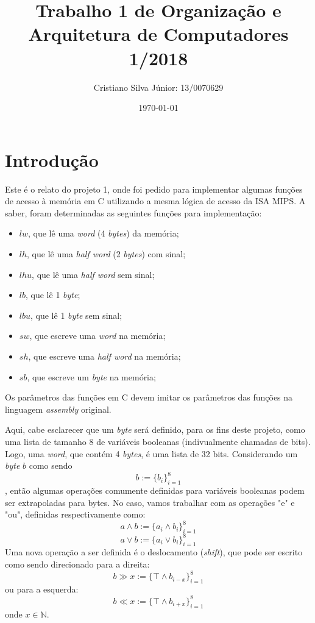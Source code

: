 \documentclass[12pt, a4paper, twoside]{article}
\begin{document}
\title{Trabalho 1 de Organização e Arquitetura de Computadores 1/2018}
\author{Cristiano Silva Júnior: 13/0070629}
\date{\today}
\maketitle

\section{Introdução}

Este é o relato do projeto 1, onde foi pedido para implementar algumas funções
de acesso à memória em C utilizando a mesma lógica de acesso da ISA MIPS. A
saber, foram determinadas as seguintes funções para implementação:

\begin{itemize}
    \item $lw$, que lê uma \textit{word} (4 \textit{bytes}) da memória;
    \item $lh$, que lê uma \textit{half word} (2 \textit{bytes}) com sinal;
    \item $lhu$, que lê uma \textit{half word} sem sinal;
    \item $lb$, que lê 1 \textit{byte};
    \item $lbu$, que lê 1 \textit{byte} sem sinal;
    \item $sw$, que escreve uma \textit{word} na memória;
    \item $sh$, que escreve uma \textit{half word} na memória;
    \item $sb$, que escreve um \textit{byte} na memória;
\end{itemize}

Os parâmetros das funções em C devem imitar os parâmetros das funções na
linguagem \textit{assembly} original.

Aqui, cabe esclarecer que um \textit{byte} será definido, para os fins
deste projeto, como uma lista de tamanho 8 de variáveis booleanas
(indivualmente chamadas de bits). Logo, uma \textit{word}, que contém 4
\textit{bytes}, é uma lista de 32 bits. Considerando um \textit{byte} $b$ como
sendo $$ b := \{ b_i \}^{8}_{i=1} $$, então algumas operações comumente
definidas para variáveis booleanas podem ser extrapoladas para bytes. No caso,
vamos trabalhar com as operações "e" e "ou", definidas respectivamente como:
$$ a \land b := \{ a_i \land b_i \}^{8}_{i=1} $$
$$ a \lor b := \{ a_i \lor b_i \}^{8}_{i=1} $$
Uma nova operação a ser definida é o deslocamento (\textit{shift}), que pode
ser escrito como sendo direcionado para a direita:
$$ b \gg x := \{ \top \land b_{i-x} \}^{8}_{i=1} $$
ou para a esquerda:
$$ b \ll x := \{ \top \land b_{i+x} \}^{8}_{i=1} $$
onde $ x \in \mathbb{N} $.
\end{document}
